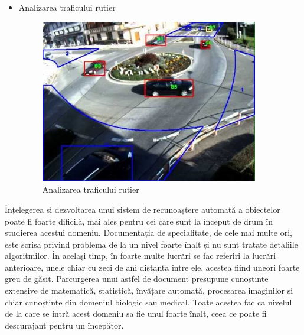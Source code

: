 \begin{itemize}
	\item Analizarea traficului rutier	
	\begin{figure}[H]
		\centering
			\includegraphics[width=0.9\textwidth]{imagini/traffic_analisys.jpg}
		\caption{Analizarea traficului rutier\protect\footnotemark}
		\label{fig:traffic_analisys}
	\end{figure}

\end{itemize}

Înțelegerea și dezvoltarea unui sistem de recunoaștere automată a obiectelor poate fi foarte dificilă, mai ales pentru cei care sunt la început de drum în studierea acestui domeniu. 
Documentația de specialitate, de cele mai multe ori, este scrisă privind problema de la un nivel foarte înalt și nu sunt tratate detaliile algoritmilor. 
În același timp, în foarte multe lucrări se fac referiri la lucrări anterioare, unele chiar cu zeci de ani distantă intre ele, acestea fiind uneori foarte greu de găsit.
Parcurgerea unui astfel de document presupune cunoștințe extensive de matematică, statistică, învățare automată, procesarea imaginilor și chiar cunoștințe din domeniul biologic sau medical. 
Toate acestea fac ca nivelul de la care se intră acest domeniu sa fie unul foarte înalt, ceea ce poate fi descurajant pentru un începător.

